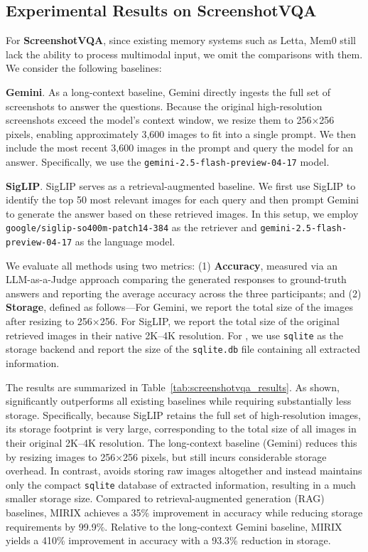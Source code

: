 \subsection{Experimental Results on ScreenshotVQA}
For \textbf{ScreenshotVQA}, since existing memory systems such as Letta, Mem0 still lack the ability to process multimodal input, we omit the comparisons with them. We consider the following baselines: 

\textbf{Gemini}. As a long-context baseline, Gemini directly ingests the full set of screenshots to answer the questions. Because the original high-resolution screenshots exceed the model’s context window, we resize them to 256×256 pixels, enabling approximately 3,600 images to fit into a single prompt. We then include the most recent 3,600 images in the prompt and query the model for an answer. Specifically, we use the \texttt{gemini-2.5-flash-preview-04-17} model.

\textbf{SigLIP}. SigLIP serves as a retrieval-augmented baseline. We first use SigLIP to identify the top 50 most relevant images for each query and then prompt Gemini to generate the answer based on these retrieved images. In this setup, we employ \texttt{google/siglip-so400m-patch14-384} as the retriever and \texttt{gemini-2.5-flash-preview-04-17} as the language model.

We evaluate all methods using two metrics: (1) \textbf{Accuracy}, measured via an LLM-as-a-Judge approach comparing the generated responses to ground-truth answers and reporting the average accuracy across the three participants; and (2) \textbf{Storage}, defined as follows—For Gemini, we report the total size of the images after resizing to 256×256. For SigLIP, we report the total size of the original retrieved images in their native 2K–4K resolution. For \ours, we use \texttt{sqlite} as the storage backend and report the size of the \texttt{sqlite.db} file containing all extracted information.

The results are summarized in Table~\ref{tab:screenshotvqa_results}. As shown, \ours significantly outperforms all existing baselines while requiring substantially less storage. Specifically, because SigLIP retains the full set of high-resolution images, its storage footprint is very large, corresponding to the total size of all images in their original 2K–4K resolution. The long-context baseline (Gemini) reduces this by resizing images to 256×256 pixels, but still incurs considerable storage overhead. In contrast, \ours avoids storing raw images altogether and instead maintains only the compact \texttt{sqlite} database of extracted information, resulting in a much smaller storage size. Compared to retrieval-augmented generation (RAG) baselines, MIRIX achieves a 35\% improvement in accuracy while reducing storage requirements by 99.9\%. Relative to the long-context Gemini baseline, MIRIX yields a 410\% improvement in accuracy with a 93.3\% reduction in storage. 

